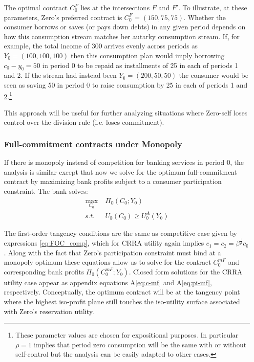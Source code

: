 \documentclass[11pt,english]{article}
\theoremstyle{plain}
\theoremstyle{plain}
\theoremstyle{plain}
\begin{document}
The optimal contract $C_{0}^{F}$ lies at the intersections $F$ and
$F'$. To illustrate, at these parameters, Zero's preferred contract
is $C_{0}^{F}=(150,75,75)$. Whether the consumer borrows or saves
(or pays down debts) in any given period depends on how this consumption
stream matches her autarky consumption stream. If, for example, the
total income of $300$ arrives evenly across periods as $Y_{0}=(100,100,100)$
then this consumption plan would imply borrowing $c_{0}-y_{0}=50$
in period 0 to be repaid as installments of 25 in each of periods
1 and 2. If the stream had instead been $Y_{0}=(200,50,50)$ the consumer
would be seen as saving 50 in period 0 to raise consumption by 25
in each of periods 1 and 2.\footnote{These parameter values are chosen for expositional purposes. In particular
$\rho=1$ implies that period zero consumption will be the same with
or without self-control but the analysis can be easily adapted to
other cases.}

This approach will be useful for further analyzing situations where
Zero-self loses control over the division rule (i.e. loses commitment).

\subsubsection{Full-commitment contracts under Monopoly}

\label{sec:own}

If there is monopoly instead of competition for banking services in
period 0, the analysis is similar except that now we solve for the
optimum full-commitment contract by maximizing bank profits subject
to a consumer participation constraint. The bank solves: 
\begin{align}
\max_{C_{0}} & \;\Pi_{0}\left(C_{0};Y_{0}\right)\label{eq:monop-obj}\\
s.t. & \;U_{0}\left(C_{0}\right)\geq U_{0}^{A}(Y_{0})\label{eq:CPC0}
\end{align}

The first-order tangency conditions are the same as competitive case
given by expressions \ref{eq:FOC_comp}, which for CRRA utility again
implies $c_{1}=c_{2}=\beta^{\frac{1}{\rho}}c_{0}$. Along with the
fact that Zero's participation constraint must bind at a monopoly
optimum these equations allow us to solve for the contract $C_{0}^{mF}$
and corresponding bank profits $\Pi_{0}\left(C_{0}^{mF};Y_{0}\right)$.
Closed form solutions for the CRRA utility case appear as appendix
equations A\ref{eq:c-mf} and A\ref{eq:pi-mf}, respectively. Conceptually,
the optimum contract will be at the tangency point where the highest
iso-profit plane still touches the iso-utility surface associated
with Zero's reservation utility.
\end{document}
